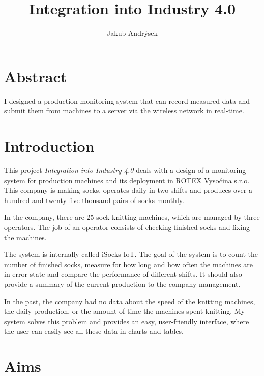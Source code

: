 \documentclass[12pt, a4paper]{article}
\title{Integration into Industry 4.0}
\author{Jakub Andrýsek}
\date{}
\begin{document}

\maketitle

\section*{Abstract}
I designed a production monitoring system that can record measured data and submit them from machines to a server via the wireless network in real-time.



\section*{Introduction}

This project \emph{Integration into Industry 4.0} deals with a design of a monitoring system for production machines and its deployment in ROTEX Vysočina s.r.o.
This company is making socks, operates daily in two shifts and produces over a hundred and twenty-five thousand pairs of socks monthly.


In the company, there are 25 sock‑knitting machines, which are managed by three operators. The job of an operator consists of checking finished socks and fixing the machines.

The system is internally called iSocks IoT.
The goal of the system is to count the number of finished socks, measure for how long and how often the machines are in error state and compare the performance of different shifts.
It should also provide a summary of the current production to the company management.

In the past, the company had no data about the speed of the knitting machines, the daily production, or the amount of time the machines spent knitting.
My system solves this problem and provides an easy, user-friendly interface, where the user can easily see all these data in charts and tables.

\newpage


\section*{Aims}
\end{document}
